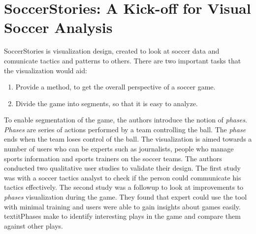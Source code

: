 \documentclass[paper=a4, fontsize=11pt]{scrartcl}
\numberwithin{equation}{section} %
\numberwithin{figure}{section} %
\numberwithin{table}{section} %
\begin{document}
\section{SoccerStories: A Kick-off for Visual Soccer Analysis~\cite{perin2013soccerstories}}
SoccerStories is visualization design, created to look at soccer data and comunicate tactics and patterns to others. There are two important tasks that the visualization would aid:
\begin{enumerate}
\item Provide a method, to get the overall perspective of a soccer game.
\item Divide the game into segments, so that it is easy to analyze.
\end{enumerate}

To enable segmentation of the game, the authors introduce the notion of \textit{phases}. \textit{Phases} are series of actions performed by a team controlling the ball. The \textit{phase} ends when the team loses control of the ball. The visualization is aimed towards a number of users who can be experts such as journalists, people who manage sports information and sports trainers on the soccer teams. The authors conducted two qualitative user studies to validate their design. The first study was with a soccer tactics analyst to check if the person could communicate his tactics effectively. The second study was a followup to look at improvements to \textit{phases} visualization during the game. They found that expert could use the tool with minimal training and users were able to gain insights about games easily. textit{Phases} make to identify interesting plays in the game and compare them against other plays.

{}

\end{document}
